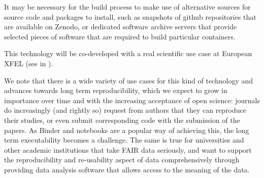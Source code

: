 \begin{task}[
  title=Improving robustness of reproducibility in repo2docker,
  id=reproducibility,
  lead=MP,
  PM=42,
  wphases={0-36},
  partners={SRL,QS,UIO}
]
\begin{compactitem}
  It may be necessary for the build process to make use of alternative
  sources for source code and packages to install, such as snapshots
  of github repositories that are available on Zenodo, or dedicated
  software archive servers that provide selected pieces of software
  that are required to build particular containers.

  \end{compactitem}



This technology will be co-developed with a real scientific use case at
European XFEL (see  in
).

  We note that there is a wide variety of use cases for this kind of
  technology and advances towards long term reproducibility, which we
  expect to grow in importance over time and with the increasing
  acceptance of open science: journals do increasingly (and rightly
  so) request from authors that they can reproduce their studies, or
  even submit corresponding code with the submission of the papers. As
  Binder and notebooks are a popular way of achieving this, the long
  term executability becomes a challenge. The same is true for
  universities and other academic institutions that take FAIR data
  seriously, and want to support the reproducibility and re-usability
  aspect of data comprehensively through providing data analysis
  software that allows access to the meaning of the data.
\end{task}
